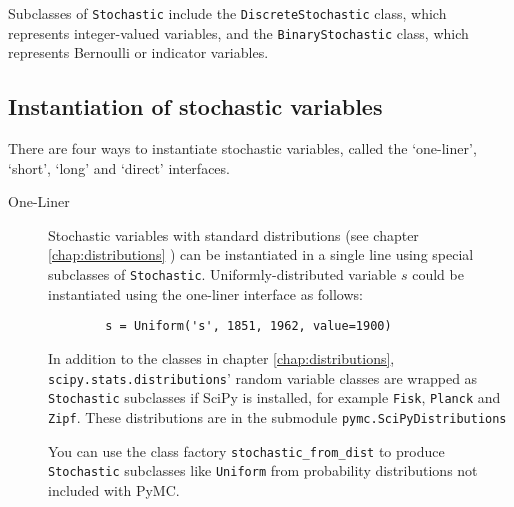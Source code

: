 Subclasses of \texttt{Stochastic} include the \texttt{DiscreteStochastic} class, which represents integer-valued variables, and the \texttt{BinaryStochastic} class, which represents Bernoulli or indicator variables. 

\subsection{Instantiation of stochastic variables}
There are four ways to instantiate stochastic variables, called the `one-liner', `short', `long' and `direct' interfaces.

\begin{description}    
    \item[One-Liner] Stochastic variables with standard distributions (see chapter \ref{chap:distributions} ) can be instantiated in a single line using special subclasses of \texttt{Stochastic}. Uniformly-distributed variable $s$ could be instantiated using the one-liner interface as follows:
    \begin{verbatim}
        s = Uniform('s', 1851, 1962, value=1900)
    \end{verbatim}

    In addition to the classes in chapter \ref{chap:distributions}, \texttt{scipy.stats.distributions}' random variable classes are wrapped as \texttt{Stochastic} subclasses if SciPy is installed, for example \texttt{Fisk}, \texttt{Planck} and \texttt{Zipf}. These distributions are in the submodule \texttt{pymc.SciPyDistributions}

    You can use the class factory \texttt{stochastic_from_dist} to produce \texttt{Stochastic} subclasses like \texttt{Uniform} from probability distributions not included with PyMC.%
    

\end{description}
